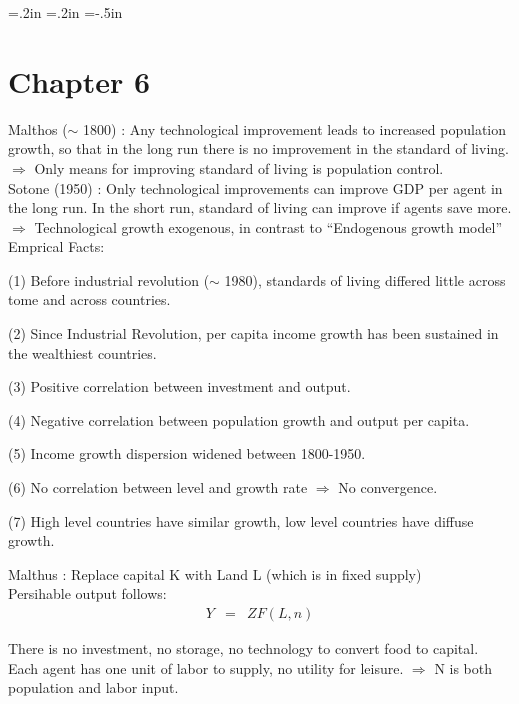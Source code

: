 \oddsidemargin=.2in
\evensidemargin=.2in
\textwidth=6in
\topmargin=-.5in
\textheight=9in
\parindent=0in
\pagestyle{empty}


\section*{Chapter 6}
Malthos ($\sim$ 1800) : Any technological improvement leads to increased population growth, so that in the long run there is no improvement in the standard of living. $\Rightarrow$ Only means for improving standard of living is population control.\\

Sotone (1950) : Only technological improvements can improve GDP per agent in the long run. In the short run, standard of living can improve if agents save more. $\Rightarrow$ Technological growth exogenous, in contrast to ``Endogenous growth model''\\

Emprical Facts:\\
\begin{list}{ }{}
\item (1) Before industrial revolution ($\sim$ 1980), standards of living differed little across tome and across countries.
\item (2) Since Industrial Revolution, per capita income growth has been sustained in the wealthiest countries.
\item (3) Positive correlation between investment and output.
\item (4) Negative correlation between population growth and output per capita.
\item (5) Income growth dispersion widened between 1800-1950.
\item (6) No correlation between level and growth rate $\Rightarrow$ No convergence.
\item (7) High level countries have similar growth, low level countries have diffuse growth.
\end{list}

Malthus : Replace capital K with Land L (which is in fixed supply)\\
Persihable output follows:
\begin{eqnarray*}
Y &=& ZF(L,n)
\end{eqnarray*}

There is no investment, no storage, no technology to convert food to capital. Each agent has one unit of labor to supply, no utility for leisure. $\Rightarrow$ N is both population and labor input.\\

